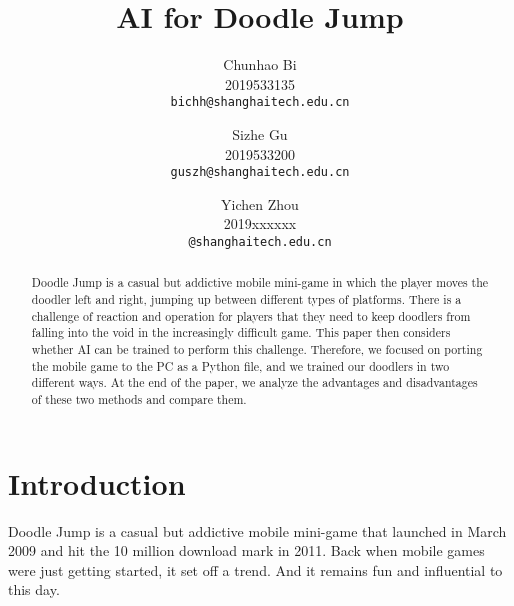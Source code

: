 \documentclass[final]{cvpr}
\begin{document}
\title{ AI for Doodle Jump }

\author{
    Chunhao Bi\\
    2019533135\\
    {\tt\small bichh@shanghaitech.edu.cn}
    \and
    Sizhe Gu\\
    2019533200\\
    {\tt\small guszh@shanghaitech.edu.cn}
    \and
    Yichen Zhou\\
    2019xxxxxx\\
    {\tt\small @shanghaitech.edu.cn}
}

\maketitle


\begin{abstract}
Doodle Jump is a casual but addictive mobile mini-game in which the player moves the doodler left and right, jumping up between different types of platforms. There is a challenge of reaction and operation for players that they need to keep doodlers from falling into the void in the increasingly difficult game. This paper then considers whether AI can be trained to perform this challenge. Therefore, we focused on porting the mobile game to the PC as a Python file, and we trained our doodlers in two different ways. At the end of the paper, we analyze the advantages and disadvantages of these two methods and compare them.
\end{abstract}

\section{Introduction}
Doodle Jump is a casual but addictive mobile mini-game that launched in March 2009 and hit the 10 million download mark in 2011. Back when mobile games were just getting started, it set off a trend. And it remains fun and influential to this day.
\end{document}
